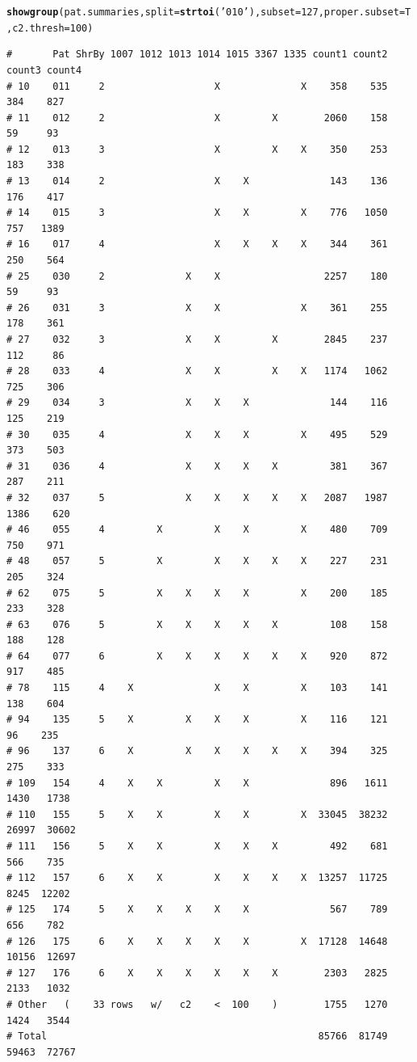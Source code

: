 \documentclass{article}\usepackage[]{graphicx}\usepackage[]{color}
\makeatletter
\newcommand{\hlnum}[1]{\textcolor[rgb]{0.686,0.059,0.569}{#1}}%
\newcommand{\hlstr}[1]{\textcolor[rgb]{0.192,0.494,0.8}{#1}}%
\newcommand{\hlstd}[1]{\textcolor[rgb]{0.345,0.345,0.345}{#1}}%
\newcommand{\hlkwc}[1]{\textcolor[rgb]{0.333,0.667,0.333}{#1}}%
\newcommand{\hlkwd}[1]{\textcolor[rgb]{0.737,0.353,0.396}{\textbf{#1}}}%
\newenvironment{kframe}{%
 \def\at@end@of@kframe{}%
 \ifinner\ifhmode%
  \def\at@end@of@kframe{\end{minipage}}%
  \begin{minipage}{\columnwidth}%
 \fi\fi%
 \def\FrameCommand##1{\hskip\@totalleftmargin \hskip-\fboxsep
 \colorbox{shadecolor}{##1}\hskip-\fboxsep
     \hskip-\linewidth \hskip-\@totalleftmargin \hskip\columnwidth}%
 \MakeFramed {\advance\hsize-\width
   \@totalleftmargin\z@ \linewidth\hsize
   \@setminipage}}%
 {\par\unskip\endMakeFramed%
 \at@end@of@kframe}
\newenvironment{knitrout}{}{} %
\makeatother
\begin{document}
\begin{knitrout}
\begin{kframe}
\begin{alltt}
\hlkwd{showgroup}\hlstd{(pat.summaries,}\hlkwc{split}\hlstd{=}\hlkwd{strtoi}\hlstd{(}\hlstr{'010'}\hlstd{),} \hlkwc{subset}\hlstd{=}\hlnum{127}\hlstd{,} \hlkwc{proper.subset}\hlstd{=T,} \hlkwc{c2.thresh}\hlstd{=}\hlnum{100}\hlstd{)}
\end{alltt}
\begin{verbatim}
#       Pat ShrBy 1007 1012 1013 1014 1015 3367 1335 count1 count2 count3 count4
# 10    011     2                   X              X    358    535    384    827
# 11    012     2                   X         X        2060    158     59     93
# 12    013     3                   X         X    X    350    253    183    338
# 13    014     2                   X    X              143    136    176    417
# 14    015     3                   X    X         X    776   1050    757   1389
# 16    017     4                   X    X    X    X    344    361    250    564
# 25    030     2              X    X                  2257    180     59     93
# 26    031     3              X    X              X    361    255    178    361
# 27    032     3              X    X         X        2845    237    112     86
# 28    033     4              X    X         X    X   1174   1062    725    306
# 29    034     3              X    X    X              144    116    125    219
# 30    035     4              X    X    X         X    495    529    373    503
# 31    036     4              X    X    X    X         381    367    287    211
# 32    037     5              X    X    X    X    X   2087   1987   1386    620
# 46    055     4         X         X    X         X    480    709    750    971
# 48    057     5         X         X    X    X    X    227    231    205    324
# 62    075     5         X    X    X    X         X    200    185    233    328
# 63    076     5         X    X    X    X    X         108    158    188    128
# 64    077     6         X    X    X    X    X    X    920    872    917    485
# 78    115     4    X              X    X         X    103    141    138    604
# 94    135     5    X         X    X    X         X    116    121     96    235
# 96    137     6    X         X    X    X    X    X    394    325    275    333
# 109   154     4    X    X         X    X              896   1611   1430   1738
# 110   155     5    X    X         X    X         X  33045  38232  26997  30602
# 111   156     5    X    X         X    X    X         492    681    566    735
# 112   157     6    X    X         X    X    X    X  13257  11725   8245  12202
# 125   174     5    X    X    X    X    X              567    789    656    782
# 126   175     6    X    X    X    X    X         X  17128  14648  10156  12697
# 127   176     6    X    X    X    X    X    X        2303   2825   2133   1032
# Other   (    33 rows   w/   c2    <  100    )        1755   1270   1424   3544
# Total                                               85766  81749  59463  72767
\end{verbatim}
\end{kframe}
\end{knitrout}
\end{document}
